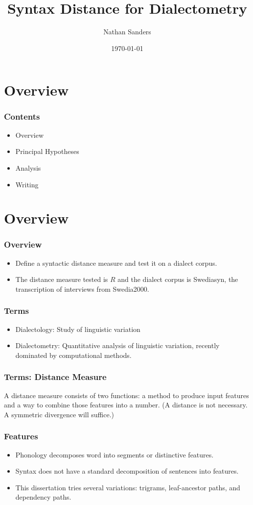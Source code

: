 \documentclass{beamer}
\title{Syntax Distance for Dialectometry}
\author{Nathan Sanders}
\date{\today}
\begin{document}
\frame{\titlepage}
\section{Overview}
\begin{frame}
  \frametitle{Contents}
  \begin{itemize}
  \item Overview
  \item Principal Hypotheses
  \item Analysis
  \item Writing
\end{itemize}
\end{frame}

\section{Overview}
\begin{frame}
  \frametitle{Overview}
  \begin{itemize}
 \item Define a syntactic distance measure and test it on a dialect corpus.
 \item The distance measure tested is $R$ and the dialect corpus is
  Swediasyn, the transcription of interviews from Swedia2000.
  \end{itemize}
\end{frame}

\begin{frame}
  \frametitle{Terms}
  \begin{itemize}
  \item Dialectology: Study of linguistic variation
  \item Dialectometry: Quantitative analysis of linguistic variation,
    recently dominated by computational methods.
 \end{itemize}
\end{frame}

\begin{frame}
  \frametitle{Terms: Distance Measure}
  A distance measure consists of two functions: a method to produce input
  features and a way to combine those features into a number. (A distance
  is not necessary. A symmetric divergence will suffice.)
\end{frame}

\begin{frame}
  \frametitle{Features}
  \begin{itemize}
  \item Phonology decomposes word into segments or distinctive features.
  \item Syntax does not have a standard decomposition of sentences into features.
  \item This dissertation tries several variations: trigrams,
    leaf-ancestor paths, and dependency paths.
  \end{itemize}
\end{frame}
\end{document}
